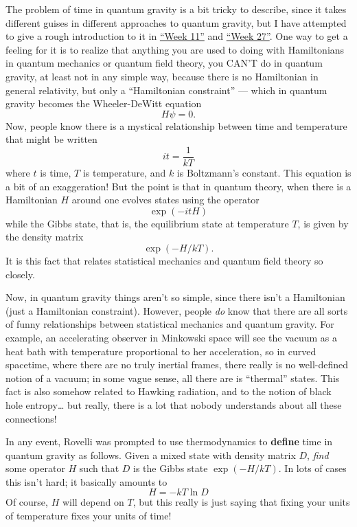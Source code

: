 \documentclass{article}
\def\tightlist{}
\renewcommand{\texttt}[1]{%
  \begingroup
  \ttfamily
  \begingroup\lccode`~=`/\lowercase{\endgroup\def~}{/\discretionary{}{}{}}%
  \begingroup\lccode`~=`[\lowercase{\endgroup\def~}{[\discretionary{}{}{}}%
  \begingroup\lccode`~=`.\lowercase{\endgroup\def~}{.\discretionary{}{}{}}%
  \catcode`/=\active\catcode`[=\active\catcode`.=\active
  \scantokens{#1\noexpand}%
  \endgroup
}
\begin{document}
\noindent
The problem of time in quantum gravity is a bit tricky to describe,
since it takes different guises in different approaches to quantum
gravity, but I have attempted to give a rough introduction to it in
\protect\hyperlink{week11}{``Week 11''} and
\protect\hyperlink{week27}{``Week 27''}. One way to get a feeling for it
is to realize that anything you are used to doing with Hamiltonians in
quantum mechanics or quantum field theory, you CAN'T do in quantum
gravity, at least not in any simple way, because there is no Hamiltonian
in general relativity, but only a ``Hamiltonian constraint'' --- which
in quantum gravity becomes the Wheeler-DeWitt equation \[H \psi = 0.\]
Now, people know there is a mystical relationship between time and
temperature that might be written \[it = \frac{1}{kT}\] where \(t\) is
time, \(T\) is temperature, and \(k\) is Boltzmann's constant. This
equation is a bit of an exaggeration! But the point is that in quantum
theory, when there is a Hamiltonian \(H\) around one evolves states
using the operator \[\exp(-itH)\] while the Gibbs state, that is, the
equilibrium state at temperature \(T\), is given by the density matrix
\[\exp(-H/kT).\] It is this fact that relates statistical mechanics and
quantum field theory so closely.

Now, in quantum gravity things aren't so simple, since there isn't a
Hamiltonian (just a Hamiltonian constraint). However, people \emph{do}
know that there are all sorts of funny relationships between statistical
mechanics and quantum gravity. For example, an accelerating observer in
Minkowski space will see the vacuum as a heat bath with temperature
proportional to her acceleration, so in curved spacetime, where there
are no truly inertial frames, there really is no well-defined notion of
a vacuum; in some vague sense, all there are is ``thermal'' states. This
fact is also somehow related to Hawking radiation, and to the notion of
black hole entropy\ldots{} but really, there is a lot that nobody
understands about all these connections!

In any event, Rovelli was prompted to use thermodynamics to
\textbf{define} time in quantum gravity as follows. Given a mixed state
with density matrix \(D\), \emph{find} some operator \(H\) such that
\(D\) is the Gibbs state \(\exp(-H/kT)\). In lots of cases this isn't
hard; it basically amounts to \[H = -kT \ln D\] Of course, \(H\) will
depend on \(T\), but this really is just saying that fixing your units
of temperature fixes your units of time!
\end{document}
